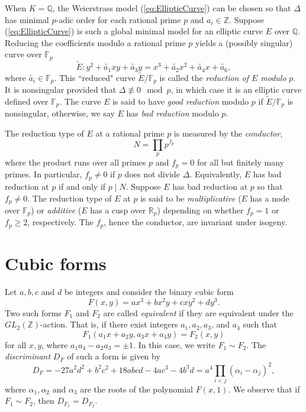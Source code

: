 \documentclass[11pt]{report}
\theoremstyle{definition}
\begin{document}
When $K = \mathbb{Q}$, the Weierstrass model (\ref{eq:EllipticCurve}) can be chosen so that $\Delta$ has minimal $p$-adic order for each rational prime $p$ and $a_i \in \mathbb{Z}$. Suppose (\ref{eq:EllipticCurve}) is such a global minimal model for an elliptic curve $E$ over $\mathbb{Q}$. Reducing the coefficients modulo a rational prime $p$ yields a (possibly singular) curve over $\mathbb{F}_p$
\begin{equation}
\tilde{E}: y^2 + \tilde{a_1}xy + \tilde{a_3}y = x^3 + \tilde{a_2}x^2 + \tilde{a_4}x + \tilde{a_6},
\end{equation}
where $\tilde{a_i} \in \mathbb{F}_p$. This ``reduced" curve $\tilde{E}/\mathbb{F}_p$ is called the \textit{reduction of $E$ modulo} $p$. It is nonsingular provided that $\Delta \not \equiv 0 \mod{p}$, in which case it is an elliptic curve defined over $\mathbb{F}_p$. The curve $E$ is said to have \textit{good reduction} modulo $p$ if $\tilde{E}/\mathbb{F}_p$ is nonsingular, otherwise, we say $E$ has \textit{bad reduction} modulo $p$.

The reduction type of $E$ at a rational prime $p$ is measured by the \textit{conductor},
\[N = \prod_{p}p^{f_p}\]
where the product runs over all primes $p$ and $f_p = 0$ for all but finitely many primes. In particular, $f_p \neq 0$ if $p$ does not divide $\Delta$. Equivalently, $E$ has bad reduction at $p$ if and only if $p \mid N$. Suppose $E$ has bad reduction at $p$ so that $f_p \neq 0$. The reduction type of $E$ at $p$ is said to be \textit{multiplicative} ($E$ has a node over $\mathbb{F}_p$) or \textit{additive} ($E$ has a cusp over $\mathbb{R}_p$) depending on whether $f_p = 1$ or $f_p \geq 2$, respectively. The $f_p$, hence the conductor, are invariant under isogeny.


\section{Cubic forms}
\label{sec:CubicForms}

Let $a,b,c$ and $d$ be integers and consider the binary cubic form
\[F(x,y) = ax^3 + bx^2y + cxy^2 + dy^3.\]
Two such forms $F_1$ and $F_2$ are called \textit{equivalent} if they are equivalent under the $GL_{2}(\mathbb{Z})$-action. That is, if there exist integers $a_1, a_2, a_3$, and $a_4$ such that
\[F_1(a_1x + a_2y, a_3x + a_4y) = F_2(x,y)\]
for all $x,y$, where $a_1a_4 - a_2a_3 = \pm 1$. In this case, we write $F_1 \sim F_2$. The \textit{discriminant} $D_F$ of such a form is given by
\[D_F = -27a^2d^2 + b^2c^2 + 18abcd - 4ac^3 - 4b^3d = a^4 \prod_{i < j} (\alpha_i - \alpha_j)^2,\]
where $\alpha_1, \alpha_2$ and $\alpha_3$ are the roots of the polynomial $F(x,1)$. We observe that if $F_1 \sim F_2$, then $D_{F_1} = D_{F_2}$.
\end{document}
